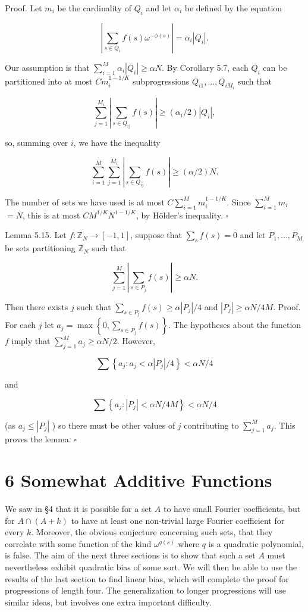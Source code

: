 \documentclass[10pt]{article}
\begin{document}
Proof. Let $m_{i}$ be the cardinality of $Q_{i}$ and let $\alpha_{i}$ be defined by the equation

$$
\left|\sum_{s \in Q_{i}} f(s) \omega^{-\phi(s)}\right|=\alpha_{i}\left|Q_{i}\right| .
$$

Our assumption is that $\sum_{i=1}^{M} \alpha_{i}\left|Q_{i}\right| \geqslant \alpha N$. By Corollary 5.7, each $Q_{i}$ can be partitioned into at most $C m_{i}^{1-1 / K}$ subprogressions $Q_{i 1}, \ldots, Q_{i M_{i}}$ such that

$$
\sum_{j=1}^{M_{i}}\left|\sum_{s \in Q_{i j}} f(s)\right| \geqslant\left(\alpha_{i} / 2\right)\left|Q_{i}\right|,
$$

so, summing over $i$, we have the inequality

$$
\sum_{i=1}^{M} \sum_{j=1}^{M_{i}}\left|\sum_{s \in Q_{i j}} f(s)\right| \geqslant(\alpha / 2) N .
$$

The number of sets we have used is at most $C \sum_{i=1}^{M} m_{i}^{1-1 / K}$. Since $\sum_{i=1}^{M} m_{i}$ $=N$, this is at most $C M^{1 / K} N^{1-1 / K}$, by Hölder's inequality. \(\square\)

Lemma 5.15. Let $f: \mathbb{Z}_{N} \rightarrow[-1,1]$, suppose that $\sum_{s} f(s)=0$ and let $P_{1}, \ldots, P_{M}$ be sets partitioning $\mathbb{Z}_{N}$ such that

$$
\sum_{j=1}^{M}\left|\sum_{s \in P_{j}} f(s)\right| \geqslant \alpha N .
$$

Then there exists $j$ such that $\sum_{s \in P_{j}} f(s) \geqslant \alpha\left|P_{j}\right| / 4$ and $\left|P_{j}\right| \geqslant \alpha N / 4 M$. Proof. For each $j$ let $a_{j}=\max \left\{0, \sum_{s \in P_{j}} f(s)\right\}$. The hypotheses about the function $f$ imply that $\sum_{j=1}^{M} a_{j} \geqslant \alpha N / 2$. However,

$$
\sum\left\{a_{j}: a_{j}<\alpha\left|P_{j}\right| / 4\right\}<\alpha N / 4
$$

and

$$
\sum\left\{a_{j}:\left|P_{j}\right|<\alpha N / 4 M\right\}<\alpha N / 4
$$

(as $a_{j} \leqslant\left|P_{j}\right|$ ) so there must be other values of $j$ contributing to $\sum_{j=1}^{M} a_{j}$. This proves the lemma. \(\square\)

\section*{6 Somewhat Additive Functions}
We saw in §4 that it is possible for a set $A$ to have small Fourier coefficients, but for $A \cap(A+k)$ to have at least one non-trivial large Fourier coefficient for every $k$. Moreover, the obvious conjecture concerning such sets, that they correlate with some function of the kind $\omega^{q(s)}$ where $q$ is a quadratic polynomial, is false. The aim of the next three sections is to show that such a set $A$ must nevertheless exhibit quadratic bias of some sort. We will then be able to use the results of the last section to find linear bias, which will complete the proof for progressions of length four. The generalization to longer progressions will use similar ideas, but involves one extra important difficulty.
\end{document}
